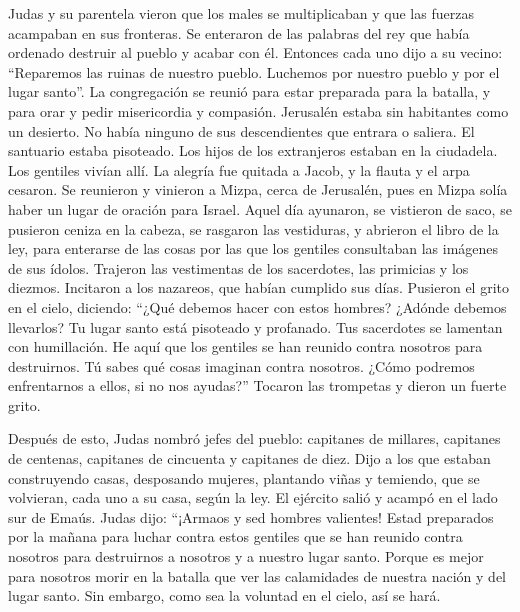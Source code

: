  Judas y su parentela vieron que los males se
multiplicaban y que las fuerzas acampaban en sus fronteras. Se enteraron
de las palabras del rey que había ordenado destruir al pueblo y acabar
con él.  Entonces cada uno dijo a su vecino: ``Reparemos
las ruinas de nuestro pueblo. Luchemos por nuestro pueblo y por el lugar
santo''.  La congregación se reunió para estar preparada
para la batalla, y para orar y pedir misericordia y compasión.
 Jerusalén estaba sin habitantes como un desierto. No
había ninguno de sus descendientes que entrara o saliera. El santuario
estaba pisoteado. Los hijos de los extranjeros estaban en la ciudadela.
Los gentiles vivían allí. La alegría fue quitada a Jacob, y la flauta y
el arpa cesaron.  Se reunieron y vinieron a Mizpa, cerca
de Jerusalén, pues en Mizpa solía haber un lugar de oración para Israel.
 Aquel día ayunaron, se vistieron de saco, se pusieron
ceniza en la cabeza, se rasgaron las vestiduras,  y
abrieron el libro de la ley, para enterarse de las cosas por las que los
gentiles consultaban las imágenes de sus ídolos. 
Trajeron las vestimentas de los sacerdotes, las primicias y los diezmos.
Incitaron a los nazareos, que habían cumplido sus días. 
Pusieron el grito en el cielo, diciendo: ``¿Qué debemos hacer con estos
hombres? ¿Adónde debemos llevarlos?  Tu lugar santo está
pisoteado y profanado. Tus sacerdotes se lamentan con humillación.
 He aquí que los gentiles se han reunido contra nosotros
para destruirnos. Tú sabes qué cosas imaginan contra nosotros.
 ¿Cómo podremos enfrentarnos a ellos, si no nos ayudas?''
 Tocaron las trompetas y dieron un fuerte grito.

 Después de esto, Judas nombró jefes del pueblo:
capitanes de millares, capitanes de centenas, capitanes de cincuenta y
capitanes de diez.  Dijo a los que estaban construyendo
casas, desposando mujeres, plantando viñas y temiendo, que se volvieran,
cada uno a su casa, según la ley.  El ejército salió y
acampó en el lado sur de Emaús.  Judas dijo: ``¡Armaos y
sed hombres valientes! Estad preparados por la mañana para luchar contra
estos gentiles que se han reunido contra nosotros para destruirnos a
nosotros y a nuestro lugar santo.  Porque es mejor para
nosotros morir en la batalla que ver las calamidades de nuestra nación y
del lugar santo.  Sin embargo, como sea la voluntad en el
cielo, así se hará.

